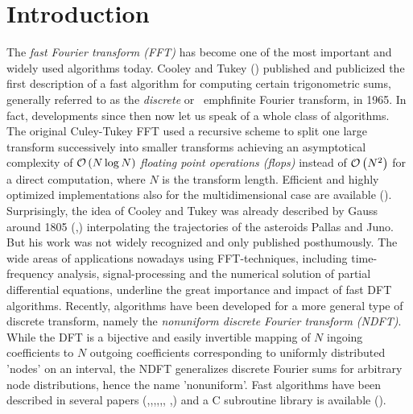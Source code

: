 
\chapter{Introduction}
\label{Introduction}

The \emph{fast Fourier transform (FFT)} has become one of the most important 
and widely used algorithms today. Cooley and Tukey (\cite{cotu}) published
and publicized the first description of a fast algorithm for computing certain
trigonometric sums, generally referred to as the \emph{discrete} or 
\ emph{finite Fourier transform}, in 1965. In fact, developments since then now
let us speak of a whole class of algorithms. The original Culey-Tukey FFT
used a recursive scheme to split one large transform successively into
smaller transforms achieving an asymptotical complexity of 
$\mathcal{O}\left(N \log N\right)$ \emph{floating point operations (flops)} instead of
$\mathcal{O}\left(N^2\right)$ for a direct computation, where $N$ is the transform length. 
Efficient and highly optimized implementations also for the
multidimensional case are available (\cite{fftw}).
Surprisingly, the idea of Cooley and Tukey was already described by Gauss around
1805 (\cite{gauss},\cite{hejobu}) interpolating the trajectories of the asteroids Pallas 
and Juno. But his work was not widely recognized and only published posthumously.
The wide areas of applications nowadays using FFT-techniques, including 
time-frequency analysis, signal-processing and the numerical solution of 
partial differential equations, underline the great importance and impact of fast
DFT algorithms.
Recently, algorithms have been developed for a more general type of discrete 
transform, namely the \emph{nonuniform discrete Fourier transform (NDFT)}. 
While the DFT is a bijective and easily invertible mapping of $N$ 
ingoing coefficients to $N$ outgoing coefficients corresponding to
uniformly distributed 'nodes' on an interval, the NDFT generalizes
discrete Fourier sums for arbitrary node distributions, hence the name
'nonuniform'. Fast algorithms have been described in several papers 
(\cite{bey95},\cite{duro93},\cite{fesu02},\cite{four},\cite{Ja},\cite{Pe},
\cite{scsc},\cite{ware98}) and a C subroutine library is available 
(\cite{kupo02C}).
